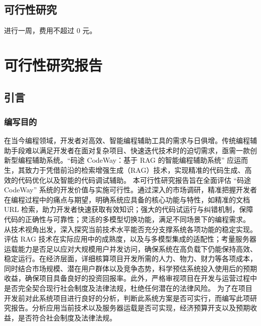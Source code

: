 \documentclass[
    report,     %
    oneside,    %
    UTF8,       %
    zihao=-4    %
]{config} %
\begin{document}
\section{可行性研究}
进行一周，费用不超过 0 元。


\chapter{可行性研究报告}
\section{引言}
\subsection{编写目的}
在当今编程领域，开发者对高效、智能编程辅助工具的需求与日俱增。传统编程辅助手段难以满足开发者在面对复杂项目、快速迭代技术时的迫切需求，亟需一款创新型编程辅助系统。“码途 CodeWay：基于 RAG 的智能编程辅助系统” 应运而生，其致力于凭借前沿的检索增强生成（RAG）技术，实现精准的代码生成、高效的代码优化以及智能的代码调试辅助。
本可行性研究报告旨在全面评估 “码途 CodeWay” 系统的开发价值与实施可行性。通过深入的市场调研，精准把握开发者在编程过程中的痛点与期望，明确系统应具备的核心功能与特性，如精准的文档 URL 检索，助力开发者快速获取有效知识；强大的代码试运行与纠错机制，保障代码的正确性与可靠性；灵活的多模型切换功能，满足不同场景下的编程需求。
从技术视角出发，深入探究当前技术水平能否充分支撑系统各项功能的稳定实现。评估 RAG 技术在实际应用中的成熟度，以及与多模型集成的适配性；考量服务器运载能力是否足以应对大规模用户并发访问，确保系统在高负载下仍能保持高效、稳定运行。在经济层面，详细核算项目开发所需的人力、物力、财力等各项成本，同时结合市场规模、潜在用户群体以及竞争态势，科学预估系统投入使用后的预期收益，确保项目具备良好的投资回报率。此外，严格审视项目在开发与运营过程中是否完全契合现行社会制度及法律法规，杜绝任何潜在的法律风险。
为了在项目开发前对此系统项目进行良好的分析，判断此系统方案是否可实行，而编写此项研究报告。分析应用当前技术以及服务器运载是否可实现，经济预算开支以及预期收益，是否符合社会制度及法律法规。
\end{document}
